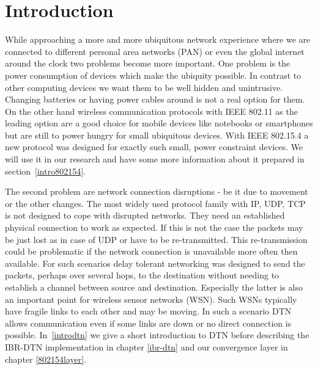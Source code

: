 \chapter{Introduction}
While approaching a more and more ubiquitous network experience where we are
connected to different personal area networks (PAN) or even the global internet
around the clock two problems become more important. One problem is the power
consumption of devices which make the ubiquity possible. In contrast to other
computing devices we want them to be well hidden and unintrusive. Changing
batteries or having power cables around is not a real option for them. On the
other hand wireless communication protocols with IEEE 802.11 \cite{ieee80211} as the
leading option are a good choice for mobile devices like notebooks or
smartphones but are still to power hungry for small ubiquitous devices.
With IEEE 802.15.4 \cite{ieee802154} a new protocol was designed for exactly such
small, power constraint devices. We will use it in our research and have some
more information about it prepared in section~\ref{intro802154}.

The second problem are network connection disruptions - be it due to movement or
the other changes. The most widely used protocol family with IP, UDP, TCP is not
designed to cope with disrupted networks. They need an established physical connection
to work as expected. If this is not the case the packets may be just lost
as in case of UDP or have to be re-transmitted. This re-transmission could be
problematic if the network connection is unavailable more often then available.
For such scenarios delay tolerant networking was designed to send the
packets, perhaps over several hops, to the destination without needing to
establish a channel between source and destination. Especially the latter is
also an important point for wireless sensor networks (WSN). Such WSNs typically
have fragile links to each other and may be moving. In such a scenario DTN
allows communication even if some links are down or no direct connection is
possible. In~\ref{introdtn} we give a short introduction to DTN before describing
the IBR-DTN implementation in chapter \ref{ibr-dtn} and our convergence layer in
chapter \ref{802154layer}.

